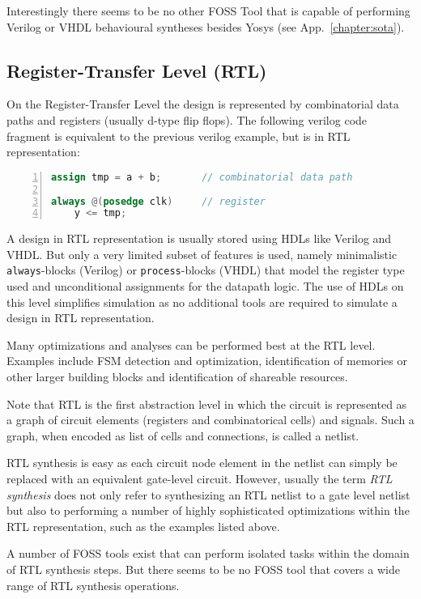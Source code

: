 Interestingly there seems to be no other FOSS Tool that is capable of
performing Verilog or VHDL behavioural syntheses besides Yosys (see
App.~\ref{chapter:sota}).

\subsection{Register-Transfer Level (RTL)}

On the Register-Transfer Level the design is represented by combinatorial data
paths and registers (usually d-type flip flops). The following verilog code fragment
is equivalent to the previous verilog example, but is in RTL representation:

\begin{lstlisting}[numbers=left,frame=single,language=Verilog]
assign tmp = a + b;       // combinatorial data path

always @(posedge clk)     // register
	y <= tmp;
\end{lstlisting}

A design in RTL representation is usually stored using HDLs like Verilog and VHDL. But only
a very limited subset of features is used, namely minimalistic {\tt always}-blocks (Verilog)
or {\tt process}-blocks (VHDL) that model the register type used and unconditional assignments
for the datapath logic. The use of HDLs on this level simplifies simulation as no additional
tools are required to simulate a design in RTL representation.

Many optimizations and analyses can be performed best at the RTL level. Examples include FSM
detection and optimization, identification of memories or other larger building blocks
and identification of shareable resources.

Note that RTL is the first abstraction level in which the circuit is represented as a
graph of circuit elements (registers and combinatorical cells) and signals. Such a graph,
when encoded as list of cells and connections, is called a netlist.

RTL synthesis is easy as each circuit node element in the netlist can simply be replaced
with an equivalent gate-level circuit. However, usually the term {\it RTL synthesis} does
not only refer to synthesizing an RTL netlist to a gate level netlist but also to performing
a number of highly sophisticated optimizations within the RTL representation, such as
the examples listed above.

A number of FOSS tools exist that can perform isolated tasks within the domain of RTL
synthesis steps. But there seems to be no FOSS tool that covers a wide range of RTL
synthesis operations.

